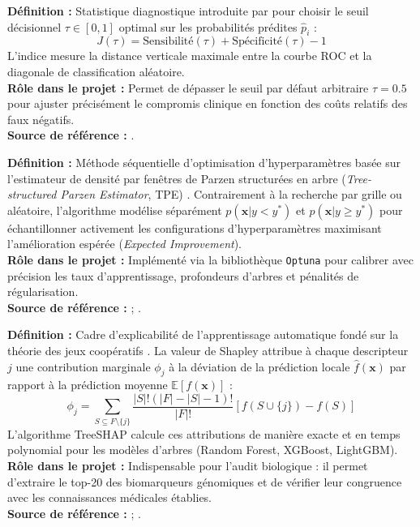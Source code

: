 \documentclass[11pt,a4paper]{article}
\begin{document}
\begin{defbox}
\textbf{Définition :} Statistique diagnostique introduite par \citet{youden1950index} pour choisir le seuil décisionnel $\tau \in [0, 1]$ optimal sur les probabilités prédites $\hat{p}_i$ :
\[
J(\tau) = \text{Sensibilité}(\tau) + \text{Spécificité}(\tau) - 1
\]
L'indice mesure la distance verticale maximale entre la courbe ROC et la diagonale de classification aléatoire.\\
\textbf{Rôle dans le projet :} Permet de dépasser le seuil par défaut arbitraire $\tau=0.5$ pour ajuster précisément le compromis clinique en fonction des coûts relatifs des faux négatifs.\\
\textbf{Source de référence :} \citet{youden1950index}.
\end{defbox}

\begin{defbox}
\textbf{Définition :} Méthode séquentielle d'optimisation d'hyperparamètres basée sur l'estimateur de densité par fenêtres de Parzen structurées en arbre (\textit{Tree-structured Parzen Estimator}, TPE) \citep{bergstra2011algorithms}. Contrairement à la recherche par grille ou aléatoire, l'algorithme modélise séparément $p(\mathbf{x}|y < y^*)$ et $p(\mathbf{x}|y \ge y^*)$ pour échantillonner activement les configurations d'hyperparamètres maximisant l'amélioration espérée (\textit{Expected Improvement}).\\
\textbf{Rôle dans le projet :} Implémenté via la bibliothèque \texttt{Optuna} \citep{akiba2019optuna} pour calibrer avec précision les taux d'apprentissage, profondeurs d'arbres et pénalités de régularisation.\\
\textbf{Source de référence :} \citet{bergstra2011algorithms} ; \citet{akiba2019optuna}.
\end{defbox}

\begin{defbox}
\textbf{Définition :} Cadre d'explicabilité de l'apprentissage automatique fondé sur la théorie des jeux coopératifs \citep{lundberg2017unified}. La valeur de Shapley attribue à chaque descripteur $j$ une contribution marginale $\phi_j$ à la déviation de la prédiction locale $\hat{f}(\mathbf{x})$ par rapport à la prédiction moyenne $\mathbb{E}[f(\mathbf{x})]$ :
\[
\phi_j = \sum_{S \subseteq F \setminus \{j\}} \frac{|S|!(|F| - |S| - 1)!}{|F|!} \left[ f(S \cup \{j\}) - f(S) \right]
\]
L'algorithme TreeSHAP \citep{lundberg2020local} calcule ces attributions de manière exacte et en temps polynomial pour les modèles d'arbres (Random Forest, XGBoost, LightGBM).\\
\textbf{Rôle dans le projet :} Indispensable pour l'audit biologique : il permet d'extraire le top-20 des biomarqueurs génomiques et de vérifier leur congruence avec les connaissances médicales établies.\\
\textbf{Source de référence :} \citet{lundberg2017unified} ; \citet{lundberg2020local}.
\end{defbox}
\end{document}
